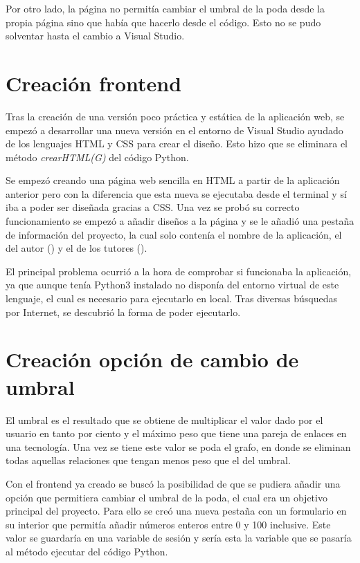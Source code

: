 Por otro lado, la página no permitía cambiar el umbral de la poda desde la propia página sino que había que hacerlo desde el código. Esto no se pudo solventar hasta el cambio a Visual Studio.

\section{Creación frontend}
Tras la creación de una versión poco práctica y estática de la aplicación web, se empezó a desarrollar una nueva versión en el entorno de Visual Studio ayudado de los lenguajes HTML y CSS para crear el diseño. Esto hizo que se eliminara el método \textit{crearHTML(G)} del código Python.

Se empezó creando una página web sencilla en HTML a partir de la aplicación anterior pero con la diferencia que esta nueva se ejecutaba desde el terminal y sí iba a poder ser diseñada gracias a CSS. Una vez se probó su correcto funcionamiento se empezó a añadir diseños a la página y se le añadió una pestaña de información del proyecto, la cual solo contenía el nombre de la aplicación, el del autor (\nombre) y el de los tutores (\nombreTutores).

El principal problema ocurrió a la hora de comprobar si funcionaba la aplicación, ya que aunque tenía Python3 instalado no disponía del entorno virtual de este lenguaje, el cual es necesario para ejecutarlo en local. Tras diversas búsquedas por Internet, se descubrió la forma de poder ejecutarlo.

\section{Creación opción de cambio de umbral}
El umbral es el resultado que se obtiene de multiplicar el valor dado por el usuario en tanto por ciento y el máximo peso que tiene una pareja de enlaces en una tecnología. Una vez se tiene este valor se poda el grafo, en donde se eliminan todas aquellas relaciones que tengan menos peso que el del umbral.

Con el frontend ya creado se buscó la posibilidad de que se pudiera añadir una opción que permitiera cambiar el umbral de la poda, el cual era un objetivo principal del proyecto. Para ello se creó una nueva pestaña con un formulario en su interior que permitía añadir números enteros entre 0 y 100 inclusive. Este valor se guardaría en una variable de sesión y sería esta la variable que se pasaría al método ejecutar del código Python.

